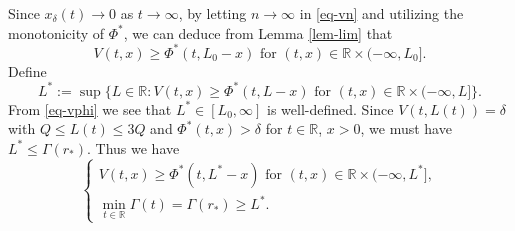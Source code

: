 \documentclass[11pt]{amsart}
\numberwithin{equation}{section}
\begin{document}
Since $x_\delta(t)\to 0$ as $t\to\infty$, by letting $n\to\infty$ in \eqref{eq-vn} and utilizing the monotonicity of $\Phi^*$, we can deduce from Lemma \ref{lem-lim} that 
\begin{equation}\label{eq-vphi}
  V(t,x)\geq \Phi^*(t,L_0-x) \text{ for }(t,x)\in\mathbb{R}\times(-\infty,L_0].
\end{equation}
Define
\begin{equation*}
  L^*:=\sup\{L\in\mathbb{R}:V(t,x)\geq \Phi^*(t,L-x) \text{ for }(t,x)\in\mathbb{R}\times(-\infty,L]\}.
\end{equation*}
From  \eqref{eq-vphi} we see that $L^*\in [L_0,\infty]$ is well-defined. Since $V(t,L(t))=\delta$ with $Q\leq L(t)\leq 3Q$ and $\Phi^*(t,x)>\delta$ for $t\in\mathbb R$, $x>0$, we must have $L^*\leq \Gamma(r_*)$. Thus we have 
\begin{equation}\label{eq-vpr}
 \begin{cases} V(t,x)\geq \Phi^*(t,L^*-x) \text{ for }(t,x)\in\mathbb{R}\times(-\infty,L^*],\\
 \min_{t\in\mathbb R}\Gamma(t)=\Gamma (r_*)\geq  L^*.
 \end{cases}
\end{equation}
\end{document}
